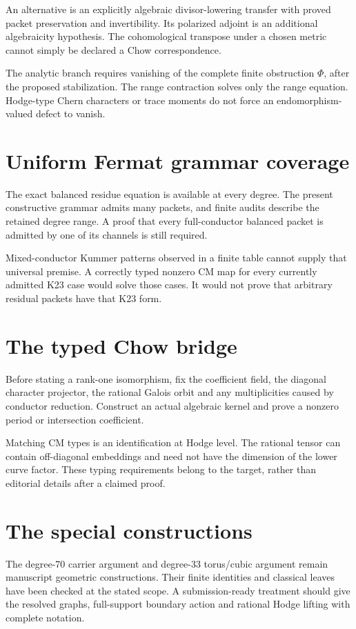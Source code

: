 An alternative is an explicitly algebraic divisor-lowering transfer with proved packet preservation and invertibility. Its polarized adjoint is an additional algebraicity hypothesis. The cohomological transpose under a chosen metric cannot simply be declared a Chow correspondence.

The analytic branch requires vanishing of the complete finite obstruction $\Phi$, after the proposed stabilization. The range contraction solves only the range equation. Hodge-type Chern characters or trace moments do not force an endomorphism-valued defect to vanish.

\section{Uniform Fermat grammar coverage}
The exact balanced residue equation is available at every degree. The present constructive grammar admits many packets, and finite audits describe the retained degree range. A proof that every full-conductor balanced packet is admitted by one of its channels is still required.

Mixed-conductor Kummer patterns observed in a finite table cannot supply that universal premise. A correctly typed nonzero CM map for every currently admitted K23 case would solve those cases. It would not prove that arbitrary residual packets have that K23 form.

\section{The typed Chow bridge}
Before stating a rank-one isomorphism, fix the coefficient field, the diagonal character projector, the rational Galois orbit and any multiplicities caused by conductor reduction. Construct an actual algebraic kernel and prove a nonzero period or intersection coefficient.

Matching CM types is an identification at Hodge level. The rational tensor can contain off-diagonal embeddings and need not have the dimension of the lower curve factor. These typing requirements belong to the target, rather than editorial details after a claimed proof.

\section{The special constructions}
The degree-70 carrier argument and degree-33 torus/cubic argument remain manuscript geometric constructions. Their finite identities and classical leaves have been checked at the stated scope. A submission-ready treatment should give the resolved graphs, full-support boundary action and rational Hodge lifting with complete notation.


